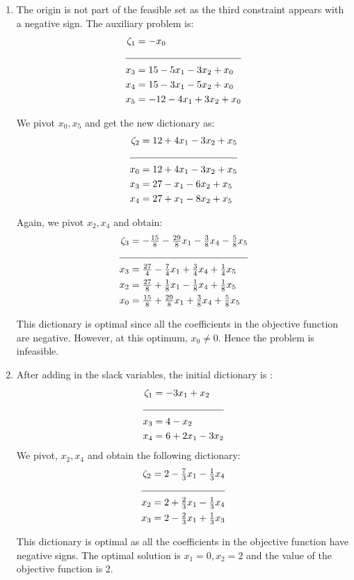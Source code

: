 \documentclass[letterpaper,12pt]{article}
\theoremstyle{definition}
\begin{document}
\begin{enumerate}
\item The origin is not part of the feasible set as the third constraint appears with a negative sign.
The auxiliary problem is:
\begin{align*}
  \zeta_1 &= -x_0\\
  \cline{1-2}
  x_3 &= 15-5x_1-3x_2+x_0\\
  x_4 &= 15-3x_1-5x_2+x_0\\
  x_5 &= -12 -4x_1+3x_2+x_0\\
\end{align*}

We pivot $x_0, x_5$ and get the new dictionary as:
\begin{align*}
  \zeta_2 &= 12+4x_1-3x_2+x_5\\
  \cline{1-2}
  x_0 &= 12+4x_1-3x_2+x_5\\
  x_3 &= 27-x_1 - 6x_2+x_5\\
  x_4 &= 27+x_1- 8x_2+x_5\\
\end{align*}

Again, we pivot $x_2, x_4$ and obtain:
\begin{align*}
  \zeta_3 &= -\tfrac{15}{8} - \tfrac{29}{8}x_1-\tfrac{3}{8}x_4- \tfrac{5}{8}x_5\\
  \cline{1-2}
  x_3 &= \tfrac{27}{4} - \tfrac{7}{4}x_1+\tfrac{3}{4}x_4+\tfrac{1}{4}x_5\\
  x_2 &= \tfrac{27}{8} + \tfrac{1}{8}x_1 -\tfrac{1}{8}x_4+\tfrac{1}{8}x_5\\
  x_0 &= \tfrac{15}{8} + \tfrac{29}{8}x_1 + \tfrac{3}{8}x_4 + \tfrac{5}{8}x_5\\
\end{align*}

This dictionary is optimal since all the coefficients in the objective function are negative. However,
at this optimum, $x_0 \ne 0$. Hence the problem is infeasible. 

\item After adding in the slack variables, the initial dictionary is :
\begin{align*}
  \zeta_1 &= -3x_1+x_2\\
  \cline{1-2}
  x_3 &= 4-x_2\\
  x_4 &= 6+2x_1-3x_2\\
\end{align*}
We pivot, $x_2, x_4$ and obtain the following dictionary:
\begin{align*}
  \zeta_2 &= 2-\tfrac{7}{3}x_1-\tfrac{1}{3}x_4\\
  \cline{1-2}
  x_2 &= 2+\tfrac{2}{3}x_1 - \tfrac{1}{3}x_4\\
  x_3 &= 2-\tfrac{2}{3}x_1+\tfrac{1}{3}x_3\\
\end{align*}

This dictionary is optimal as all the coefficients in the objective function have negative signs.
The optimal solution is $x_1= 0, x_2 = 2$ and the value of the objective function is 2.
\end{enumerate}
\end{document}
